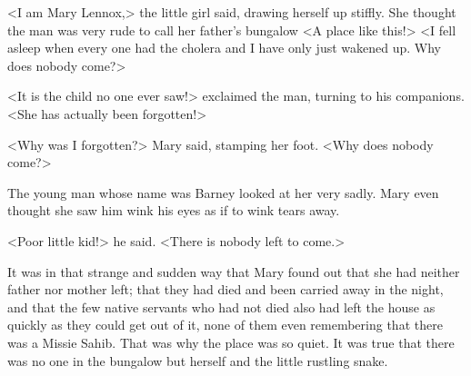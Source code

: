 <I am Mary Lennox,> the little girl said, drawing herself up stiffly. She thought the man was very rude to call her father's bungalow <A place like this!> <I fell asleep when every one had the cholera and I have only just wakened up. Why does nobody come?>

<It is the child no one ever saw!> exclaimed the man, turning to his companions. <She has actually been forgotten!>

<Why was I forgotten?> Mary said, stamping her foot. <Why does nobody come?>

The young man whose name was Barney looked at her very sadly. Mary even thought she saw him wink his eyes as if to wink tears away.

<Poor little kid!> he said. <There is nobody left to come.>

It was in that strange and sudden way that Mary found out that she had neither father nor mother left; that they had died and been carried away in the night, and that the few native servants who had not died also had left the house as quickly as they could get out of it, none of them even remembering that there was a Missie Sahib. That was why the place was so quiet. It was true that there was no one in the bungalow but herself and the little rustling snake.
